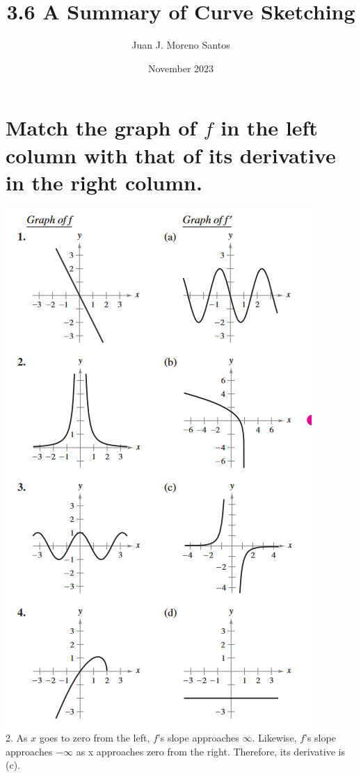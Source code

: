 \documentclass[11pt]{article}
\begin{document}
\title{3.6 A Summary of Curve Sketching}
\author{Juan J. Moreno Santos}
\date{November 2023}

\maketitle
\section{Match the graph of $f$ in the left column with that of its derivative in the right column.}
\includegraphics[scale=0.8]{2.png}\\
2. As $x$ goes to zero from the left, $f$'s slope approaches $\infty$. Likewise, $f$'s slope approaches $-\infty$ as x approaches zero from the right. Therefore, its derivative is (c).
\end{document}
